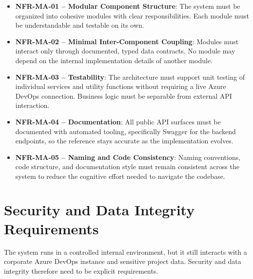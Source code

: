 \begin{itemize}
  \item \textbf{NFR-MA-01 -- Modular Component Structure}: The system must be organized into cohesive modules with clear responsibilities. Each module must be understandable and testable on its own.

  \item \textbf{NFR-MA-02 -- Minimal Inter-Component Coupling}: Modules must interact only through documented, typed data contracts. No module may depend on the internal implementation details of another module.

  \item \textbf{NFR-MA-03 -- Testability}: The architecture must support unit testing of individual services and utility functions without requiring a live Azure DevOps connection. Business logic must be separable from external API interaction.

  \item \textbf{NFR-MA-04 -- Documentation}: All public API surfaces must be documented with automated tooling, specifically Swagger for the backend endpoints, so the reference stays accurate as the implementation evolves.

  \item \textbf{NFR-MA-05 -- Naming and Code Consistency}: Naming conventions, code structure, and documentation style must remain consistent across the system to reduce the cognitive effort needed to navigate the codebase.
\end{itemize}

\section{Security and Data Integrity Requirements}
\label{sec:req-security}

The system runs in a controlled internal environment, but it still interacts with
a corporate Azure DevOps instance and sensitive project data. Security and data
integrity therefore need to be explicit requirements.

